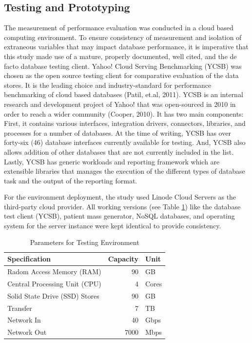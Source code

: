 \documentclass[5p]{elsarticle}
\begin{document}
\subsection{Testing and Prototyping}
The measurement of performance evaluation was conducted in a cloud based computing environment. To ensure consistency of measurement and isolation of extraneous variables that may impact database performance, it is imperative that this study made use of a mature, properly documented, well cited, and the de facto database testing client. Yahoo! Cloud Serving Benchmarking (YCSB) was chosen as the open source testing client for comparative evaluation of the data stores. It is the leading choice and industry-standard for performance benchmarking of cloud based databases (Patil, et.al, 2011).
YCSB is an internal research and development project of Yahoo! that was open-sourced in 2010 in order to reach a wider community (Cooper, 2010). It has two main components: First, it contains various interfaces, integration drivers, connectors, libraries, and processes for a number of databases. At the time of writing, YCSB has over forty-six (46) database interfaces currently available for testing. And, YCSB also allows addition of other databases that are not currently included in the list. Lastly, YCSB has generic workloads and reporting framework which are extensible libraries that manages the execution of the different types of database task and the output of the reporting format.

For the environment deployment, the study used Linode Cloud Servers as the third-party cloud provider. 
All working versions (see Table \ref{table.cloud.environment}) like the database test client (YCSB), patient mass generator, NoSQL databases, 
and operating system for the server instance were kept identical to provide consistency. 

\begin{table}[ht]
    \centering
    \caption{Parameters for Testing Environment}
     \label{table.cloud.environment}
        \begin{tabular}{lrl}
        \toprule
        Specification &  Capacity & Unit \\
        \hline
        Radom Access Memory (RAM)  & 90 &GB \\
        Central Processing Unit (CPU)  & 4 &Cores \\
        Solid State Drive (SSD) Stores  & 90 &GB \\
        Transfer &  7 &TB \\
        Network In &  40 &Gbps \\
        Network Out &  7000 &Mbps \\
        \hline
    \end{tabular}
\end{table}
\end{document}
